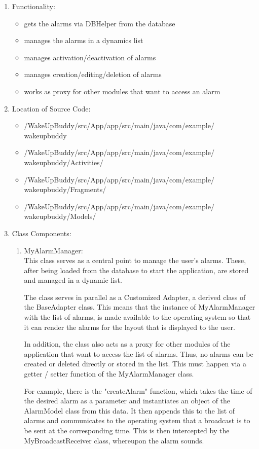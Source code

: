 \documentclass[conference]{IEEEtran}
\begin{document}
\begin{enumerate}
    \item Functionality: 
    \begin{itemize}
        \item gets the alarms via DBHelper from the database
        \item manages the alarms in a dynamics list
        \item manages activation/deactivation of alarms
        \item manages creation/editing/deletion of alarms
        \item works as proxy for other modules that want to access an alarm
    \end{itemize} 
    \item Location of Source Code:
    \begin{itemize}
        \item /WakeUpBuddy/src/App/app/src/main/java/com/example/ wakeupbuddy
        \item /WakeUpBuddy/src/App/app/src/main/java/com/example/ wakeupbuddy/Activities/
        \item /WakeUpBuddy/src/App/app/src/main/java/com/example/ wakeupbuddy/Fragments/
        \item /WakeUpBuddy/src/App/app/src/main/java/com/example/ wakeupbuddy/Models/
    \end{itemize} 
    \item Class Components:
    \begin{enumerate}
        \item MyAlarmManager: \\
            This class serves as a central point to manage the user's alarms. These, after being loaded from the database to start the application, are stored and managed in a dynamic list. 
            \par The class serves in parallel as a Customized Adapter, a derived class of the BaseAdapter class. This means that the instance of MyAlarmManager with the list of alarms, is made available to the operating system so that it can render the alarms for the layout that is displayed to the user.
            \par In addition, the class also acts as a proxy for other modules of the application that want to access the list of alarms. Thus, no alarms can be created or deleted directly or stored in the list. This must happen via a getter / setter function of the MyAlarmManager class. 
            \par For example, there is the "createAlarm" function, which takes the time of the desired alarm as a parameter and instantiates an object of the AlarmModel class from this data. It then appends this to the list of alarms and communicates to the operating system that a broadcast is to be sent at the corresponding time. This is then intercepted by the MyBroadcastReceiver class, whereupon the alarm sounds.

\end{enumerate}
\end{enumerate}
\end{document}
